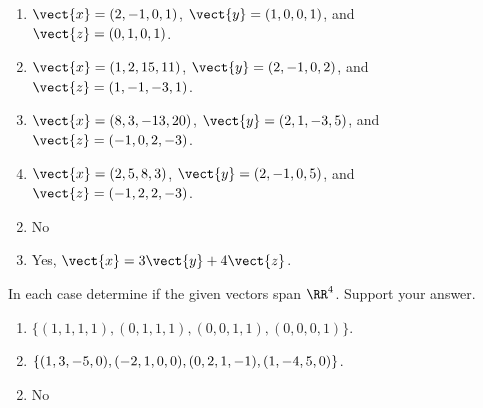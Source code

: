 \begin{multicols}{2}
\begin{ex}
\begin{enumerate}[label={\alph*.}]
\item $\vect{x} = (2, -1, 0, 1)$, $\vect{y} = (1, 0, 0, 1)$, and \\$\vect{z} = (0, 1, 0, 1)$.

\item $\vect{x} = (1, 2, 15, 11)$, $\vect{y} = (2, -1, 0, 2)$, and \\$\vect{z} = (1, -1, -3, 1)$.

\item $\vect{x} = (8, 3, -13, 20)$, $\vect{y} = (2, 1, -3, 5)$, and $\vect{z} = (-1, 0, 2, -3)$.

\item $\vect{x} = (2, 5, 8, 3)$, $\vect{y} = (2, -1, 0, 5)$, and \\$\vect{z} = (-1, 2, 2, -3)$.

\end{enumerate}
\begin{sol}
\begin{enumerate}[label={\alph*.}]
\setcounter{enumi}{1}
\item  No

\setcounter{enumi}{3}
\item  Yes, $\vect{x} = 3\vect{y} + 4\vect{z}$.

\end{enumerate}
\end{sol}
\end{ex}

\begin{ex}
In each case determine if the given vectors span $\RR^4$. Support your answer.

\begin{enumerate}[label={\alph*.}]
\item $\{(1, 1, 1, 1), (0, 1, 1, 1), (0, 0, 1, 1), (0, 0, 0, 1)\}$.

\item $\{(1, 3, -5, 0), (-2, 1, 0, 0), (0, 2, 1, -1),\\ (1, -4, 5, 0)\}$.

\end{enumerate}
\begin{sol}
\begin{enumerate}[label={\alph*.}]
\setcounter{enumi}{1}
\item  No

\end{enumerate}
\end{sol}
\end{ex}


\end{multicols}
